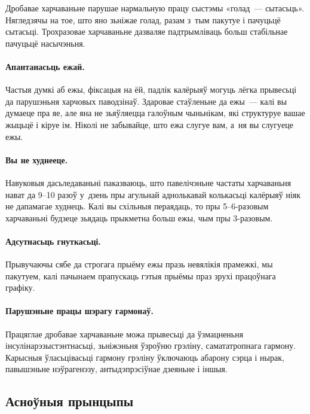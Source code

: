 Дробавае харчаваньне парушае нармальную працу сыстэмы «голад~--- сытасьць». Нягледзячы на тое, што яно зьніжае голад, разам з~тым пакутуе і пачуцьцё сытасьці. Трохразовае харчаваньне дазваляе падтрымліваць больш стабільнае пачуцьцё насычэньня.

\paragraph{Апантанасьць ежай.}
Частыя думкі аб ежы, фіксацыя на ёй, падлік калёрыяў могуць лёгка прывесьці да парушэньня харчовых паводзінаў. Здаровае стаўленьне да ежы~--- калі вы думаеце пра яе, але яна не зьяўляецца галоўным чыньнікам, які структуруе вашае жыцьцё і кіруе ім. Ніколі не забывайце, што ежа слугуе вам, а~ня вы слугуеце ежы.

\paragraph{Вы не худнееце.}
Навуковыя дасьледаваньні паказваюць, што павелічэньне частаты харчаваньня нават да 9--10 разоў у~дзень пры агульнай аднолькавай колькасьці калёрыяў ніяк не дапамагае худнець. Калі вы схільныя пераядаць, то пры 5--6-разовым харчаваньні будзеце зьядаць прыкметна больш ежы, чым пры 3-разовым.


\paragraph{Адсутнасьць гнуткасьці.}
Прывучаючы сябе да строгага прыёму ежы празь невялікія прамежкі, мы пакутуем, калі пачынаем прапускаць гэтыя прыёмы праз зрухі працоўнага графіку.

\paragraph{Парушэньне працы шэрагу гармонаў.}
Працяглае дробавае харчаваньне можа прывесьці да ўзмацненьня інсулінарэзыстэнтнасьці, зьніжэньня ўзроўню грэліну, самататропнага гармону. Карысныя ўласьцівасьці гармону грэліну ўключаюць абарону сэрца і нырак, павышэньне нэўрагенэзу, антыдэпрэсіўнае дзеяньне і іншыя.

\subsection{Асноўныя прынцыпы}

